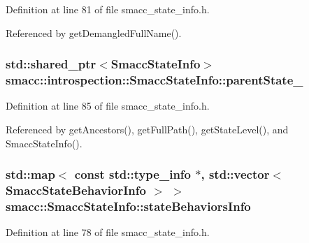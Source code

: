 Definition at line 81 of file smacc\+\_\+state\+\_\+info.\+h.



Referenced by get\+Demangled\+Full\+Name().

\subsubsection[{\texorpdfstring{parent\+State\+\_\+}{parentState_}}]{\setlength{\rightskip}{0pt plus 5cm}std\+::shared\+\_\+ptr$<${\bf Smacc\+State\+Info}$>$ smacc\+::introspection\+::\+Smacc\+State\+Info\+::parent\+State\+\_\+}\hypertarget{classsmacc_1_1introspection_1_1SmaccStateInfo_afa49a141d2ccdb3d6f9676ed380ce006}{}\label{classsmacc_1_1introspection_1_1SmaccStateInfo_afa49a141d2ccdb3d6f9676ed380ce006}


Definition at line 85 of file smacc\+\_\+state\+\_\+info.\+h.



Referenced by get\+Ancestors(), get\+Full\+Path(), get\+State\+Level(), and Smacc\+State\+Info().

\subsubsection[{\texorpdfstring{state\+Behaviors\+Info}{stateBehaviorsInfo}}]{\setlength{\rightskip}{0pt plus 5cm}std\+::map$<$ const std\+::type\+\_\+info $\ast$, std\+::vector$<$ {\bf Smacc\+State\+Behavior\+Info} $>$ $>$ smacc\+::\+Smacc\+State\+Info\+::state\+Behaviors\+Info\hspace{0.3cm}{\ttfamily [static]}}\hypertarget{classsmacc_1_1introspection_1_1SmaccStateInfo_a7f62357b9ed1db5b8f9fcc3394f7f58b}{}\label{classsmacc_1_1introspection_1_1SmaccStateInfo_a7f62357b9ed1db5b8f9fcc3394f7f58b}


Definition at line 78 of file smacc\+\_\+state\+\_\+info.\+h.



